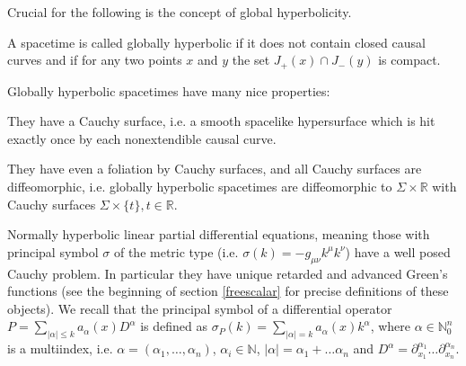 \documentclass[12pt]{article}
\newcommand{\NN}{\mathbb{N}}          %
\newcommand{\RR}{\mathbb{R}}           %
\newcommand{\al}{\alpha}
\newcommand{\1}{\mathds{1}}                         %
\begin{document}
Crucial for the following is the concept of global hyperbolicity.

{\begin{df} A spacetime is called globally hyperbolic if it does not contain closed causal curves and if for any two points $x$ and $y$ the set $J_+(x)\cap J_-(y)$ is compact.
\end{df}}


{Globally hyperbolic spacetimes have many nice properties: }
\begin{itemize}

{\item They have a Cauchy surface, i.e. a smooth spacelike hypersurface which is hit exactly once by each nonextendible causal curve.}

{\item They have even a foliation by Cauchy surfaces, and all Cauchy surfaces are diffeomorphic, i.e. globally hyperbolic spacetimes are diffeomorphic to $\Sigma\times\RR$ with Cauchy surfaces $\Sigma\times\{t\},t\in\RR$.}

\item  Normally hyperbolic linear partial differential equations, meaning those with principal symbol $\sigma$ of the metric type (i.e. $\sigma(k)=-g_{\mu\nu}k^\mu k^\nu$) have a well posed Cauchy problem. In particular they have unique retarded and advanced Green's functions (see the beginning of section \ref{freescalar} for precise definitions of these objects). We recall that the principal symbol of a differential operator $P=\sum_{|\al|\leq k}a_\al(x)D^\al$ is defined as $\sigma_P(k)=\sum_{|\al|= k}a_\al(x)k^\al$, where $\al\in \mathbb{N}^n_0$ is a multiindex, i.e. $\alpha = (\alpha_1, \ldots,\alpha_n)$, $\al_i\in\NN$, $|\al|=\al_1+\ldots\al_n$  and $D^\al=\partial_{x_1}^{\alpha_1} \ldots \partial_{x_n}^{\alpha_n}$.
\end{itemize}
\end{document}
